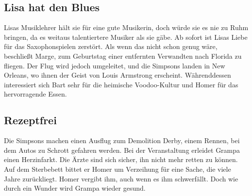 
\subsection{Lisa hat den Blues}\label{XABF11}
Lisas Musiklehrer hält sie für eine gute Musikerin, doch würde sie es nie zu Ruhm bringen, da es weitaus talentiertere Musiker als sie gäbe. Ab sofort ist Lisas Liebe für das Saxophonspielen zerstört. Als wenn das nicht schon genug wäre, beschließt Marge, zum Geburtstag einer entfernten Verwandten nach Florida zu fliegen. Der Flug wird jedoch umgeleitet, und die Simpsons landen in New Orleans, wo ihnen der Geist von Louis Armstrong erscheint. Währenddessen interessiert sich Bart sehr für die heimische Voodoo-Kultur und Homer für das hervorragende Essen.


\subsection{Rezeptfrei}\label{XABF09}
Die Simpsons machen einen Ausflug zum Demolition Derby, einem Rennen, bei dem Autos zu Schrott gefahren werden. Bei der Veranstaltung erleidet Grampa einen Herzinfarkt. Die Ärzte sind sich sicher, ihn nicht mehr retten zu können. Auf dem Sterbebett bittet er Homer um Verzeihung für eine Sache, die viele Jahre zurückliegt. Homer vergibt ihm, auch wenn es ihm schwerfällt. Doch wie durch ein Wunder wird Grampa wieder gesund.

